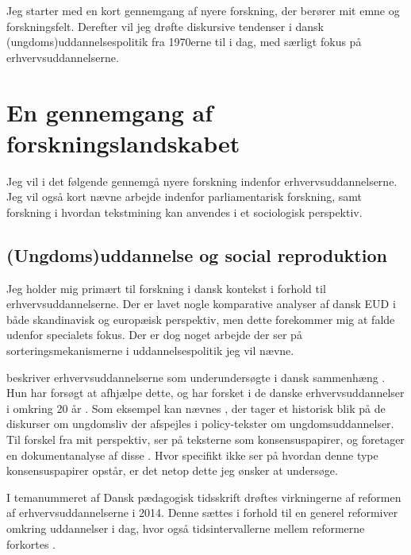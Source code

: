 Jeg starter med en kort gennemgang af nyere forskning, der berører mit emne og forskningsfelt.
Derefter vil jeg drøfte diskursive tendenser i dansk (ungdoms)uddannelsespolitik fra 1970erne til i dag, med særligt fokus på erhvervsuddannelserne.

\chapter{En gennemgang af forskningslandskabet}\label{sec:litreview}

Jeg vil i det følgende gennemgå nyere forskning indenfor erhvervsuddannelserne.
Jeg vil også kort nævne arbejde indenfor parliamentarisk forskning, samt forskning i hvordan tekstmining kan anvendes i et sociologisk perspektiv.

\section{(Ungdoms)uddannelse og social reproduktion}
Jeg holder mig primært til forskning i dansk kontekst i forhold til erhvervsuddannelserne.
Der er lavet nogle komparative analyser af dansk EUD i både skandinavisk og europæisk perspektiv, men dette forekommer mig at falde udenfor specialets fokus.
Der er dog noget arbejde der ser på sorteringsmekanismerne i uddannelsespolitik jeg vil nævne.

\citeauthor{juulErhvervsuddannelserneForsomtForskningsomrade2004} beskriver erhvervsuddannelserne som underundersøgte i dansk sammenhæng \autocite{juulErhvervsuddannelserneForsomtForskningsomrade2004}.
Hun har forsøgt at afhjælpe dette, og har forsket i de danske erhvervsuddannelser i omkring 20 år \autocite{IdaJuulPublikationer}.
Som eksempel kan nævnes , der tager et historisk blik på de diskurser om ungdomsliv der afspejles i policy-tekster om ungdomsuddannelser.
Til forskel fra mit perspektiv, ser \citeauthor{juulDiskurserOmUngdom2013} på teksterne som konsensuspapirer, og foretager en dokumentanalyse af disse \autocite{juulDiskurserOmUngdom2013}.
Hvor \citeauthor{juulDiskurserOmUngdom2013} specifikt ikke ser på hvordan denne type konsensuspapirer opstår, er det netop dette jeg ønsker at undersøge.

I temanummeret  af Dansk pædagogisk tidsskrift drøftes virkningerne af reformen af erhvervsuddannelserne i 2014.
Denne sættes i forhold til en generel reformiver omkring uddannelser i dag, hvor også tidsintervallerne mellem reformerne forkortes \autocite[s. 2]{cangerTemaErhvervsuddannelserMellem2016}. 

